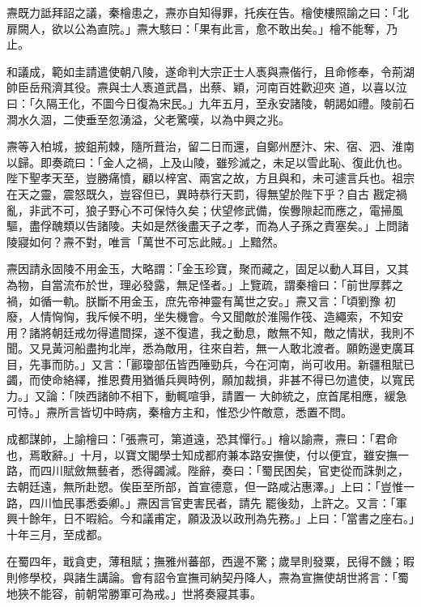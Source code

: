 \begin{pinyinscope}
 燾既力詆拜詔之議，秦檜患之，燾亦自知得罪，托疾在告。檜使樓照諭之曰：「北扉闕人，欲以公為直院。」燾大駭曰：「果有此言，愈不敢出矣。」檜不能奪，乃止。



 和議成，範如圭請遣使朝八陵，遂命判大宗正士人褭與燾偕行，且命修奉，令荊湖帥臣岳飛濟其役。燾與士人褭道武昌，出蔡、穎，河南百姓歡迎夾
 道，以喜以泣曰：「久隔王化，不圖今日復為宋民。」九年五月，至永安諸陵，朝謁如禮。陵前石澗水久涸，二使垂至忽湧溢，父老驚嘆，以為中興之兆。



 燾等入柏城，披鉏荊棘，隨所葺治，留二日而還，自鄭州歷汴、宋、宿、泗、淮南以歸。即奏疏曰：「金人之禍，上及山陵，雖殄滅之，未足以雪此恥、復此仇也。陛下聖孝天至，豈勝痛憤，顧以梓宮、兩宮之故，方且與和，未可遽言兵也。祖宗在天之靈，震怒既久，豈容但已，異時恭行天罰，得無望於陛下乎？自古
 戡定禍亂，非武不可，狼子野心不可保恃久矣；伏望修武備，俟釁隙起而應之，電掃風驅，盡俘醜類以告諸陵。夫如是然後盡天子之孝，而為人子孫之責塞矣。」上問諸陵寢如何？燾不對，唯言「萬世不可忘此賊。」上黯然。



 燾因請永固陵不用金玉，大略謂：「金玉珍寶，聚而藏之，固足以動人耳目，又其為物，自當流布於世，理必發露，無足怪者。」上覽疏，謂秦檜曰：「前世厚葬之禍，如循一軌。朕斷不用金玉，庶先帝神靈有萬世之安。」燾又言：「頃劉豫
 初廢，人情恟恟，我斥候不明，坐失機會。今又聞敵於淮陽作筏、造繩索，不知安用？諸將朝廷戒勿得遣間探，遂不復遣，我之動息，敵無不知，敵之情狀，我則不聞。又見黃河船盡拘北岸，悉為敵用，往來自若，無一人敢北渡者。願飭邊吏廣耳目，先事而防。」又言：「酈瓊部伍皆西陲勁兵，今在河南，尚可收用。新疆租賦已蠲，而使命絡繹，推恩費用猶循兵興時例，願加裁損，非甚不得已勿遣使，以寬民力。」又論：「陜西諸帥不相下，動輒喧爭，請置一
 大帥統之，庶首尾相應，緩急可恃。」燾所言皆切中時病，秦檜方主和，惟恐少忤敵意，悉置不問。



 成都謀帥，上諭檜曰：「張燾可，第道遠，恐其憚行。」檜以諭燾，燾曰：「君命也，焉敢辭。」十月，以寶文閣學士知成都府兼本路安撫使，付以便宜，雖安撫一路，而四川賦斂無藝者，悉得蠲減。陛辭，奏曰：「蜀民困矣，官吏從而誅剝之，去朝廷遠，無所赴愬。俟臣至所部，首宣德意，但一路咸沾惠澤。」上曰：「豈惟一路，四川恤民事悉委卿。」燾因言官吏害民者，請先
 罷後劾，上許之。又言：「軍興十餘年，日不暇給。今和議甫定，願汲汲以政刑為先務。」上曰：「當書之座右。」十年三月，至成都。



 在蜀四年，戢貪吏，薄租賦；撫雅州蕃部，西邊不驚；歲旱則發粟，民得不饑；暇則修學校，與諸生講論。會有詔令宣撫司納契丹降人，燾為宣撫使胡世將言：「蜀地狹不能容，前朝常勝軍可為戒。」世將奏寢其事。




\end{pinyinscope}
